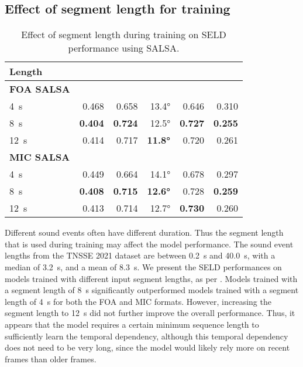 \documentclass[journal]{IEEEtran}
\begin{document}
\subsection{Effect of segment length for training}

\begin{table}[t]
    \setlength{\tabcolsep}{3pt}
    \centering
    \caption{Effect of segment length during training on SELD performance using SALSA.}
    \noindent\begin{tabularx}{\columnwidth}{Xrrrrr}
    \toprule 
        Length &
          &
          &
         &
          &
         
        \\ \midrule
        \bfseries FOA SALSA\\
        
        \SI{4}{\second}      & 0.468 & 0.658 & 13.4\si{\degree} & 0.646 & 0.310 
                \\
        \SI{8}{\second}       & \bf{0.404} & \bf{0.724} & 12.5\si{\degree} & \bf{0.727} & \bf{0.255}
               \\
        \SI{12}{\second}      & 0.414 & 0.717 & \bf{11.8\si{\degree}} & 0.720 & 0.261
               \\ 
        \midrule
        \bfseries MIC SALSA\\
        
        \SI{4}{\second}      
                & 0.449 & 0.664 & 14.1\si{\degree} & 0.678 & 0.297 \\
        \SI{8}{\second}     
                & \bf{0.408} & \bf{0.715} & \bf{12.6\si{\degree}} & 0.728 & \bf{0.259} \\
        \SI{12}{\second}    & 0.413 & 0.714 & 12.7\si{\degree} & \bf{0.730} & 0.260 \\ 
    \bottomrule
    \end{tabularx}
    \label{tab:segment_length}
\end{table}

Different sound events often have different duration. Thus the segment length that is used during training may affect the model performance. The sound event lengths from the TNSSE 2021 dataset are between \SI{0.2}{\second} and \SI{40.0}{\second}, with a median of \SI{3.2}{\second}, and a mean of \SI{8.3}{\second}. We present the SELD performances on models trained with different input segment lengths, as per . Models trained with a segment length of \SI{8}{\second} significantly outperformed models trained with a segment length of \SI{4}{\second} for both the FOA and MIC formats. However, increasing the segment length to \SI{12}{\second} did not further improve the overall performance. Thus, it appears that the model requires a certain minimum sequence length to sufficiently learn the temporal dependency, although this temporal dependency does not need to be very long, since the model would likely rely more on recent frames than older frames.  
\end{document}
